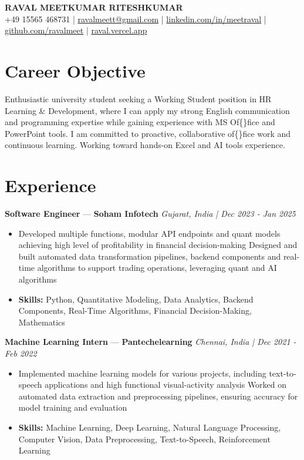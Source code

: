 \documentclass[a4paper,10pt]{article}
\begin{document}
\begin{center}
  {\Large\bfseries RAVAL MEETKUMAR RITESHKUMAR}\\[2pt]
  {\small +49 15565 468731 \;|\; \href{mailto:ravalmeett@gmail.com}{ravalmeett@gmail.com} \;|\; \href{https://www.linkedin.com/in/meetraval/}{linkedin.com/in/meetraval} \;|\; \href{https://github.com/ravalmeet}{github.com/ravalmeet} \;|\; \href{https://raval.vercel.app/}{raval.vercel.app}}
\end{center}
\vspace{-3pt}

\section*{Career Objective}
Enthusiastic university student seeking a Working Student position in HR Learning \& Development, where I can apply my strong English communication and programming expertise while gaining experience with MS Of\{\}fice and PowerPoint tools. I am committed to proactive, collaborative of\{\}fice work and continuous learning. Working toward hands-on Excel and AI tools experience.\par

\section*{Experience}
\textbf{Software Engineer} — \textbf{Soham Infotech} \hfill \textit{Gujarat, India \;|\; Dec 2023 - Jan 2025}\par
\vspace{1pt}
\begin{itemize}
  \item Developed multiple functions, modular API endpoints and quant models achieving high level of profitability in financial decision-making Designed and built automated data transformation pipelines, backend components and real-time algorithms to support trading operations, leveraging quant and AI algorithms
  \item \textbf{Skills:} Python, Quantitative Modeling, Data Analytics, Backend Components, Real-Time Algorithms, Financial Decision-Making, Mathematics
\end{itemize}
\vspace{3pt}
\textbf{Machine Learning Intern} — \textbf{Pantechelearning} \hfill \textit{Chennai, India \;|\; Dec 2021 - Feb 2022}\par
\vspace{1pt}
\begin{itemize}
  \item Implemented machine learning models for various projects, including text-to-speech applications and high functional visual-activity analysis Worked on automated data extraction and preprocessing pipelines, ensuring accuracy for model training and evaluation
  \item \textbf{Skills:} Machine Learning, Deep Learning, Natural Language Processing, Computer Vision, Data Preprocessing, Text-to-Speech, Reinforcement Learning
\end{itemize}
\end{document}
